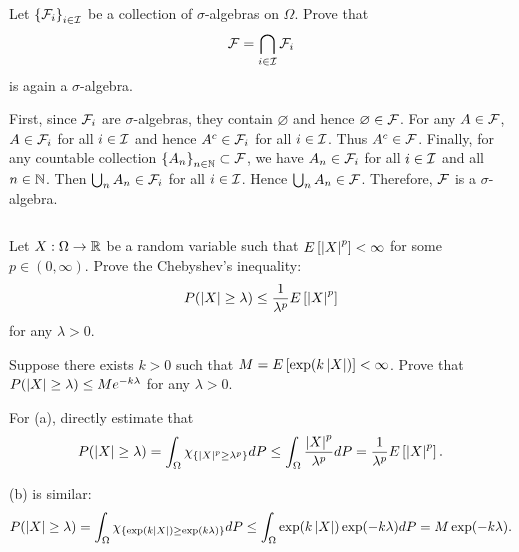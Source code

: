 \begin{exercise}{2.3}
    Let $\left\{ {\mathcal{F}_i} \right\}_{i\in\mathcal{I}}$ be a collection of $\sigma$-algebras on $\Omega$. Prove that 
    \begin{equation*}
        \mathcal{F} = \bigcap_{i\in\mathcal{I}} \mathcal{F}_i
    \end{equation*}
    is again a $\sigma$-algebra.
\end{exercise}
\begin{solution}
    First, since $\mathcal{F}_i$ are $\sigma$-algebras, they contain $\varnothing$ and hence 
    $\varnothing\in\mathcal{F}$. For any $A\in\mathcal{F}$, $A\in\mathcal{F}_i$ for all $i\in\mathcal{I}$ and hence 
    $A^c\in\mathcal{F}_i$ for all $i\in\mathcal{I}$. Thus $A^c\in\mathcal{F}$. Finally, for any countable 
    collection $\left\{ {A_n} \right\}_{n\in\mathbb{N}}\subset\mathcal{F}$, we have $A_n\in\mathcal{F}_i$ for all 
    $i\in\mathcal{I}$ and all $n\in\mathbb{N}$. Then $\bigcup_n A_n\in\mathcal{F}_i$ for all $i\in\mathcal{I}$. 
    Hence $\bigcup_n A_n\in\mathcal{F}$. Therefore, $\mathcal{F}$ is a $\sigma$-algebra.
\end{solution}

\begin{exercise}{2.4}$ $\vspace{-1.5em}
    \begin{thmenum}
        \item Let $X:\Omega\to\mathbb{R}$ be a random variable such that $E\left[ {\left\lvert {X} \right\rvert^p} \right]<\infty$ 
        for some $p\in(0,\infty)$. Prove the Chebyshev's inequality:
        \begin{equation*}
            P(\left\lvert {X} \right\rvert\geq \lambda) \leq \frac{1}{\lambda^p}E\left[ {\left\lvert {X} \right\rvert^p} \right]
        \end{equation*}
        for any $\lambda>0$. 
        \item Suppose there exists $k>0$ such that $M = E\left[ {\exp(k\left\lvert {X} \right\rvert)} \right]<\infty$. 
        Prove that $P(\left\lvert {X} \right\rvert\geq \lambda)\leq Me^{-k\lambda}$ for any $\lambda>0$.
    \end{thmenum}
\end{exercise}
\begin{solution}
    For (a), directly estimate that 
    \begin{equation*}
        P(\left\lvert {X} \right\rvert\geq \lambda) = \int_\Omega \chi_{\left\{ {\left\lvert {X} \right\rvert^p\geq \lambda^p} \right\}}dP 
        \leq \int_\Omega \frac{\left\lvert {X} \right\rvert^p}{\lambda^p}dP = \frac{1}{\lambda^p}E\left[ {\left\lvert {X} \right\rvert^p} \right].
    \end{equation*}

    (b) is similar: 
    \begin{equation*}
        P(\left\lvert {X} \right\rvert\geq \lambda) = \int_\Omega \chi_{\left\{ {\exp(k\left\lvert {X} \right\rvert)\geq \exp(k\lambda)} \right\}}dP 
        \leq \int_\Omega \exp(k\left\lvert {X} \right\rvert)\exp(-k\lambda)dP = M\exp(-k\lambda).
    \end{equation*}
\end{solution}


